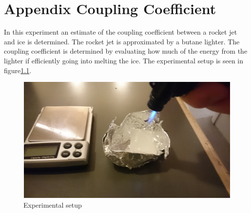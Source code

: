 \chapter{Appendix Coupling Coefficient}\label{app:coupling}

In this experiment an estimate of the coupling coefficient between a rocket jet and ice is determined. The rocket jet is approximated by a butane lighter. The coupling coefficient is determined by evaluating how much of the energy from the lighter if efficiently going into melting the ice. The experimental setup is seen in figure\ref{fig:coupling}.

\begin{figure}[htb]
\begin{center}
\includegraphics[scale=0.5]{figures/navtheory/coupling}
\caption{Experimental setup}
\label{fig:coupling}
\end{center}
\end{figure}


